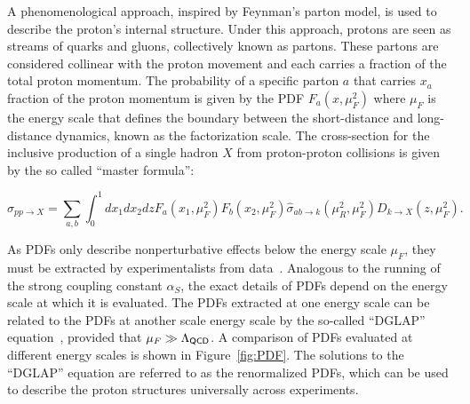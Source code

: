 A phenomenological approach, inspired by Feynman's parton model, is used to describe the proton's internal structure. Under this approach, protons are seen as streams of quarks and gluons, collectively known as partons. These partons are considered collinear with the proton movement and each carries a fraction of the total proton momentum. The probability of a specific parton $a$ that carries $x_{a}$ fraction of the proton momentum is given by the \ac{PDF} $F_{a}(x,\mu_{F}^2)$ where $\mu_{F}$ is the energy scale that defines the boundary between the short-distance and long-distance dynamics, known as the factorization scale. The cross-section for the inclusive production of a single hadron $X$ from proton-proton collisions is given by the so called ``master formula'':

\begin{equation}
\label{eq:master}
\sigma_{pp\rightarrow X}=\sum_{a,b}\int_{0}^{1}dx_{1}dx_{2}dzF_{a}(x_{1},\mu_{F}^2)F_{b}(x_{2},\mu_{F}^2)\hat{\sigma}_{ab\rightarrow k}(\mu_{R}^2,\mu_{F}^2)D_{k\rightarrow X}(z,\mu_{F}^2).
\end{equation} 

As \acp{PDF} only describe nonperturbative effects below the energy scale $\mu_{F}$, they must be extracted by experimentalists from data~\cite{NNPDF:2014otw,NNPDF:2017mvq}. Analogous to the running of the strong coupling constant $\alpha_{S}$, the exact details of \acp{PDF} depend on the energy scale at which it is evaluated. The \acp{PDF} extracted at one energy scale can be related to the \acp{PDF} at another scale energy scale by the so-called ``DGLAP'' equation~\cite{Gribov:1971zn,Altarelli:1977zs,Dokshitzer:1977sg}, provided that $\mu_{F}\gg\mathrm{\mathrm{\Lambda}_{\textsf{QCD}}}$. A comparison of \acp{PDF} evaluated at different energy scales is shown in Figure~\ref{fig:PDF}. The solutions to the ``DGLAP'' equation are referred to as the renormalized \acp{PDF}, which can be used to describe the proton structures universally across experiments. 

